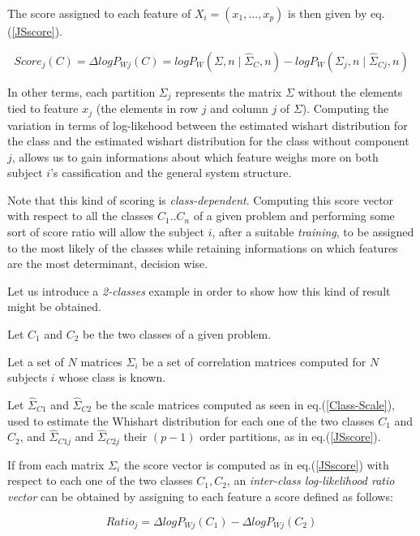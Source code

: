 \documentclass[12pt,openright,twoside,a4paper]{book}
\begin{document}
The score assigned to each feature of $X_i=(x_1,...,x_p)$ is then given by eq.(\ref{JSscore}).

\begin{equation}
Score_j(C)=\Delta logP_{Wj}(C)=logP_W(\Sigma, n \mid \hat{\Sigma}_C,n)-logP_W(\Sigma_j, n \mid \hat{\Sigma}_{Cj},n)
\label{JSscore}
\end{equation}
\vspace{5mm}

In other terms, each partition $\Sigma_j$ represents the matrix $\Sigma$ without the elements tied to feature $x_j$ (the elements in row $j$ and column $j$ of $\Sigma$). Computing the variation in terms of log-likehood  between the estimated wishart distribution for the class and the estimated wishart distribution for the class without component $j$, allows us to gain informations about which feature weighs more on both subject $i$'s cassification and the general system structure.

Note that this kind of scoring is \textit{class-dependent}. Computing this score vector with respect to all the classes $C_1..C_n$ of a given problem and performing  some sort of score ratio will allow the subject $i$, after a suitable \textit{training},  to be assigned to the most likely of the classes while retaining informations on which features are the most determinant, decision wise.
\vspace{5mm}

Let us introduce a \textit{2-classes} example in order to show how this kind of result might be obtained.

Let $C_1$ and $C_2$ be the two classes of a given problem. 

Let a set of $N$ matrices $\Sigma_i$ be a set of correlation matrices computed for $N$ subjects $i$ whose class is known. 

Let $\hat{\Sigma}_{C1}$ and $\hat{\Sigma}_{C2}$ be  the scale matrices computed as seen in eq.(\ref{Class-Scale}), used to estimate the Whishart distribution for each one of the two classes $C_1$ and $C_2$, and  $\hat{\Sigma}_{C1j}$ and $\hat{\Sigma}_{C2j}$ their $(p-1)$ order partitions, as in eq.(\ref{JSscore}).

If from each matrix $\Sigma_i$ the score vector is computed as in eq.(\ref{JSscore}) with respect to each one of the two classes $C_1,C_2$, an \textit{inter-class log-likelihood ratio vector} can be obtained by assigning to each feature a score defined as follows:

\begin{equation}
Ratio_j=\Delta logP_{Wj}(C_1)-\Delta logP_{Wj}(C_2)
\label{JRatio}
\end{equation}
\end{document}
